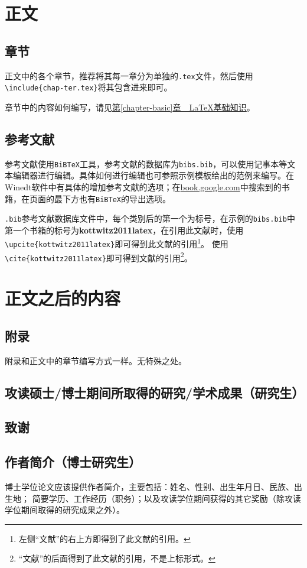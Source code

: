 \section{正文}
\subsection{章节}
正文中的各个章节，推荐将其每一章分为单独的\texttt{.tex}文件，然后使用\texttt{\textbackslash include\{chap\hyp{}ter.tex\}}将其包含进来即可。

章节中的内容如何编写，请见\hyperref[chapter-basic]{第\ref{chapter-basic}章~~\LaTeX{}基础知识}。

\subsection{参考文献}
参考文献使用\texttt{BiBTeX}工具，参考文献的数据库为\texttt{bibs.bib}，可以使用记事本等文本编辑器进行编辑。具体如何进行编辑也可参照示例模板给出的范例来编写。在Winedt软件中有具体的增加参考文献的选项；在\url{book.google.com}中搜索到的书籍，在页面的最下方也有\texttt{BiBTeX}的导出选项。

\texttt{.bib}参考文献数据库文件中，每个类别后的第一个为标号，在示例的\texttt{bibs.bib}中第一个书箱的标号为\textbf{kottwitz2011latex}，在引用此文献时，使用\verb|\upcite{kottwitz2011latex}|即可得到此文献的引用\footnote{左侧“文献”的右上方即得到了此文献的引用。}。
使用\verb|\cite{kottwitz2011latex}|即可得到文献\cite{kottwitz2011latex}的引用\footnote{“文献”的后面得到了此文献的引用，不是上标形式。}。

\section{正文之后的内容}
\subsection{附录}
附录和正文中的章节编写方式一样。无特殊之处。
\subsection{攻读硕士\slash 博士期间所取得的研究\slash 学术成果（研究生）}
\subsection{致谢}
\subsection{作者简介（博士研究生）}
博士学位论文应该提供作者简介，主要包括：姓名、性别、出生年月日、民族、出生地；
简要学历、工作经历（职务）；以及攻读学位期间获得的其它奖励（除攻读学位期间取得的研究成果之外）。
